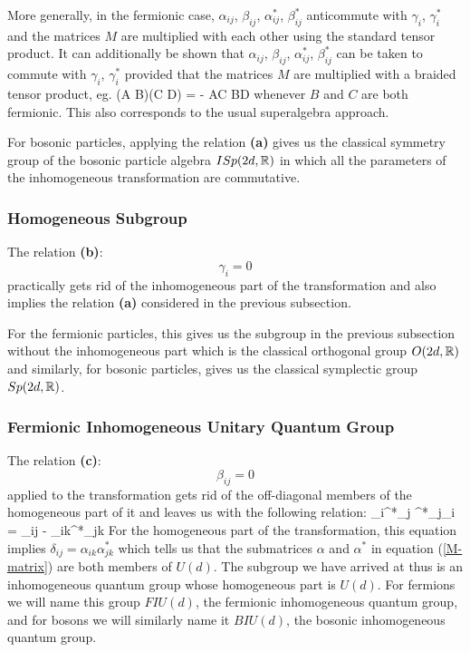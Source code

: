 More generally, in the fermionic case, $\alpha_{ij}$,
$\beta_{ij}$, $\alpha^*_{ij}$, $\beta^*_{ij}$ anticommute with
$\gamma_i$, $\gamma^*_i$ and the \FIO matrices $M$ are multiplied
with each other using the standard tensor product. It can
additionally be shown that $\alpha_{ij}$, $\beta_{ij}$,
$\alpha^*_{ij}$, $\beta^*_{ij}$ can be taken to commute with
$\gamma_i$, $\gamma^*_i$ provided that the matrices $M$ are
multiplied with a braided \cite{majid} tensor product, eg. \beq (A
\otimes B)(C \otimes D) = - AC \otimes BD \eeq whenever $B$ and
$C$ are both fermionic. This also corresponds to the usual
superalgebra approach.

For bosonic particles, applying the relation {\bf(a)} gives us the
classical symmetry group of the bosonic particle algebra $ISp(2d,
\mathbb{R})$ in which all the parameters of the inhomogeneous
transformation are commutative.

\subsubsection{Homogeneous Subgroup}
The relation {\bf(b)}:
\[
\gamma_i = 0
\]
practically gets rid of the inhomogeneous part of the
transformation and also implies the relation {\bf(a)} considered
in the previous subsection.

For the fermionic particles, this gives us the subgroup in the
previous subsection without the inhomogeneous part which is the
classical orthogonal group $O(2d, \mathbb{R})$ and similarly, for bosonic
particles, gives us the classical symplectic group $Sp(2d, \mathbb{R})$.

\subsubsection{Fermionic Inhomogeneous Unitary Quantum Group}
The relation {\bf(c)}:
\[
\beta_{ij} = 0
\]
applied to the transformation gets rid of the off-diagonal members
of the homogeneous part of it and leaves us with the following
relation: \beq \gamma_i\gamma^*_j \mp \gamma^*_j\gamma_i =
\delta_{ij} - \alpha_{ik}\alpha^*_{jk} \eeq For the homogeneous
part of the transformation, this equation implies $ \delta_{ij} =
\alpha_{ik}\alpha^*_{jk} $ which tells us that the submatrices
$\alpha$ and $\alpha^*$ in equation (\ref{M-matrix}) are both
members of $U(d)$. The subgroup we have arrived at thus is an
inhomogeneous quantum group whose homogeneous part is $U(d)$. For
fermions we will name this group $FIU(d)$, the fermionic
inhomogeneous quantum group, and for bosons we will similarly name
it $BIU(d)$, the bosonic inhomogeneous quantum group.

